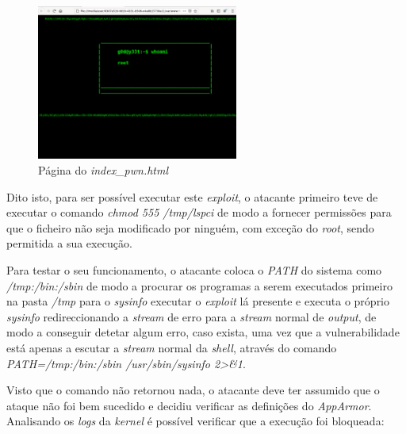 \documentclass[10pt,english]{article}
\begin{document}
\begin{figure}[h]
    \centering
    \includegraphics[width=250]{images/pwn.png}
    \caption{Página do \textit{index\_pwn.html}}
\end{figure}

\par Dito isto, para ser possível executar este \textit{exploit}, o atacante primeiro teve de executar o comando \textit{chmod 555 /tmp/lspci} de modo a fornecer permissões para que o ficheiro não seja modificado por ninguém, com exceção do \textit{root}, sendo permitida a sua execução.

\par Para testar o seu funcionamento, o atacante coloca o \textit{PATH} do sistema como \textit{/tmp:/bin:/sbin} de modo a procurar os programas a serem executados primeiro na pasta \textit{/tmp} para o \textit{sysinfo} executar o \textit{exploit} lá presente e executa o próprio \textit{sysinfo} redireccionando a \textit{stream} de erro para a \textit{stream} normal de \textit{output}, de modo a conseguir detetar algum erro, caso exista, uma vez que a vulnerabilidade está apenas a escutar a \textit{stream} normal da \textit{shell}, através do comando \textit{PATH=/tmp:/bin:/sbin /usr/sbin/sysinfo 2>&1}. 

\par Visto que o comando não retornou nada, o atacante deve ter assumido que o ataque não foi bem sucedido e decidiu verificar as definições do \textit{AppArmor}. Analisando os \textit{logs} da \textit{kernel} é possível verificar que a execução foi bloqueada:
\end{document}
